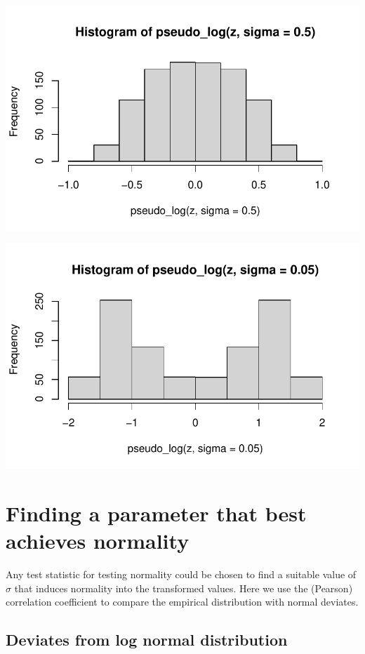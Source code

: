 \documentclass[
  letterpaper,
  DIV=11,
  numbers=noendperiod]{scrreport}
\begin{document}
\includegraphics{./Pseudo_log_explainer_files/figure-pdf/pl05-4.pdf}

\includegraphics{./Pseudo_log_explainer_files/figure-pdf/pl05-5.pdf}

\hypertarget{finding-a-parameter-that-best-achieves-normality}{%
\section{Finding a parameter that best achieves
normality}\label{finding-a-parameter-that-best-achieves-normality}}

Any test statistic for testing normality could be chosen to find a
suitable value of \(\sigma\) that induces normality into the transformed
values. Here we use the (Pearson) correlation coefficient to compare the
empirical distribution with normal deviates.

\hypertarget{deviates-from-log-normal-distribution}{%
\subsection{Deviates from log normal
distribution}\label{deviates-from-log-normal-distribution}}
\end{document}
